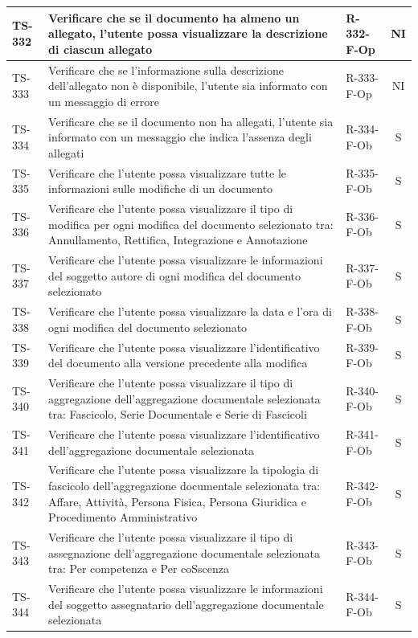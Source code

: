 \documentclass[a4paper,12pt]{article}
\begin{document}
\begin{longtable}{|p{1.5cm}|p{8.3cm}|p{2.4cm}|c|}
\hline
TS-332 & Verificare che se il documento ha almeno un allegato, l'utente possa visualizzare la descrizione di ciascun allegato & R-332-F-Op & NI \\
\hline
TS-333 & Verificare che se l'informazione sulla descrizione dell'allegato non è disponibile, l'utente sia informato con un messaggio di errore & R-333-F-Op & NI \\
\hline
TS-334 & Verificare che se il documento non ha allegati, l'utente sia informato con un messaggio che indica l'assenza degli allegati & R-334-F-Ob & S \\
\hline
TS-335 & Verificare che l'utente possa visualizzare tutte le informazioni sulle modifiche di un documento & R-335-F-Ob & S \\
\hline
TS-336 & Verificare che l'utente possa visualizzare il tipo di modifica per ogni modifica del documento selezionato tra: Annullamento, Rettifica, Integrazione e Annotazione & R-336-F-Ob & S \\
\hline
TS-337 & Verificare che l'utente possa visualizzare le informazioni del soggetto autore di ogni modifica del documento selezionato & R-337-F-Ob & S \\
\hline
TS-338 & Verificare che l'utente possa visualizzare la data e l'ora di ogni modifica del documento selezionato & R-338-F-Ob & S \\
\hline
TS-339 & Verificare che l'utente possa visualizzare l'identificativo del documento alla versione precedente alla modifica & R-339-F-Ob & S \\
\hline
TS-340 & Verificare che l'utente possa visualizzare il tipo di aggregazione dell'aggregazione documentale selezionata tra: Fascicolo, Serie Documentale e Serie di Fascicoli & R-340-F-Ob & S \\
\hline
TS-341 & Verificare che l'utente possa visualizzare l'identificativo dell'aggregazione documentale selezionata & R-341-F-Ob & S \\
\hline
TS-342 & Verificare che l'utente possa visualizzare la tipologia di fascicolo dell'aggregazione documentale selezionata tra: Affare, Attività, Persona Fisica, Persona Giuridica e Procedimento Amministrativo & R-342-F-Ob & S \\
\hline
TS-343 & Verificare che l'utente possa visualizzare il tipo di assegnazione dell'aggregazione documentale selezionata tra: Per competenza e Per coSscenza & R-343-F-Ob & S \\
\hline
TS-344 & Verificare che l'utente possa visualizzare le informazioni del soggetto assegnatario dell'aggregazione documentale selezionata & R-344-F-Ob & S \\

\end{longtable}
\end{document}
